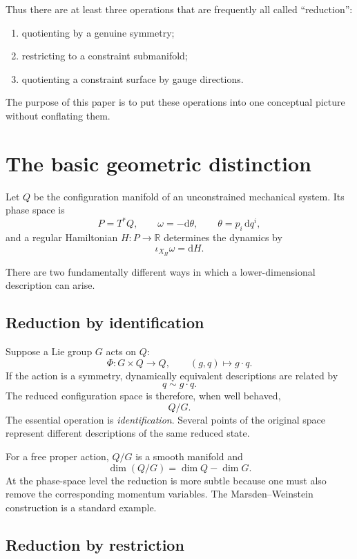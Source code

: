 \documentclass[11pt,a4paper]{article}
\newcommand{\R}{\mathbb R}
\newcommand{\dd}{\mathrm d}
\theoremstyle{definition}
\begin{document}
Thus there are at least three operations that are frequently all called
``reduction'':
\begin{enumerate}[label=(\roman*)]
\item quotienting by a genuine symmetry;
\item restricting to a constraint submanifold;
\item quotienting a constraint surface by gauge directions.
\end{enumerate}
The purpose of this paper is to put these operations into one conceptual
picture without conflating them.

\section{The basic geometric distinction}

Let $Q$ be the configuration manifold of an unconstrained mechanical system.
Its phase space is
\[
        P=T^*Q,
        \qquad
        \omega=-\dd\theta,
        \qquad
        \theta=p_i\,\dd q^i,
\]
and a regular Hamiltonian $H:P\to\R$ determines the dynamics by
\[
        \iota_{X_H}\omega=\dd H.
\]

There are two fundamentally different ways in which a lower-dimensional
description can arise.

\subsection{Reduction by identification}

Suppose a Lie group $G$ acts on $Q$:
\[
        \Phi:G\times Q\longrightarrow Q,
        \qquad
        (g,q)\mapsto g\cdot q.
\]
If the action is a symmetry, dynamically equivalent descriptions are related
by
\[
        q\sim g\cdot q.
\]
The reduced configuration space is therefore, when well behaved,
\[
        Q/G.
\]
The essential operation is \emph{identification}.  Several points of the
original space represent different descriptions of the same reduced state.

For a free proper action, $Q/G$ is a smooth manifold and
\[
        \dim(Q/G)=\dim Q-\dim G.
\]
At the phase-space level the reduction is more subtle because one must also
remove the corresponding momentum variables.  The Marsden--Weinstein
construction is a standard example.

\subsection{Reduction by restriction}
\end{document}
